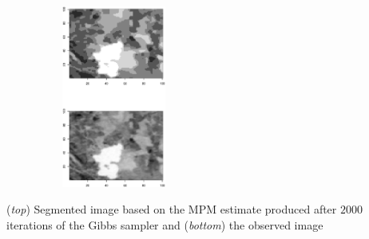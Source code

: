 \begin{slide}
\begin{figure}
\begin{center}
\includegraphics[width=5cm,height=6cm]{figures/recons.eps}
\end{center}
\end{figure}

\footnotesize ({\em top}) Segmented image based on the MPM estimate produced after $2000$ iterations of
the Gibbs sampler and ({\em bottom}) the observed image

\end{slide}
